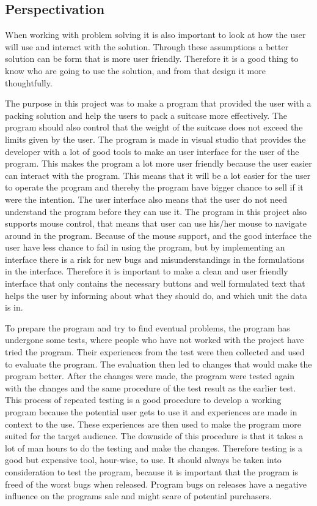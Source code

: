 \subsection{Perspectivation}
When working with problem solving it is also important to look at how the user will use and interact with the solution. Through these assumptions a better solution can be form that is more user friendly. Therefore it is a good thing to know who are going to use the solution, and from that design it more thoughtfully.

The purpose in this project was to make a program that provided the user with a packing solution and help the users to pack a suitcase more effectively. The program should also control that the weight of the suitcase does not exceed the limits given by the user. The program is made in visual studio that provides the developer with a lot of good tools to make an user interface for the user of the program.
This makes the program a lot more user friendly because the user easier can interact with the program. This means that it will be a lot easier for the user to operate the program and thereby the program have bigger chance to sell if it were the intention.
The user interface also means that the user do not need understand the program before they can use it.
The program in this project also supports mouse control, that means that user can use his/her mouse to navigate around in the program. Because of the mouse support, and the good interface the user have less chance to fail in using the program, but by implementing an interface there is a risk for new bugs and misunderstandings in the formulations in the interface.
Therefore it is important to make a clean and user friendly interface that only contains the necessary buttons and well formulated text that helps the user by informing about what they should do, and which unit the data is in.

To prepare the program and try to find eventual problems, the program has undergone some tests, where people who have not worked with the project have tried the program. Their experiences from the test were then collected and used to evaluate the program. The evaluation then led to changes that would make the program better. After the changes were made, the program were tested again with the changes and the same procedure of the test result as the earlier test.
This process of repeated testing is a good procedure to develop a working program because the potential user gets to use it and experiences are made in context to the use. These experiences are then used to make the program more suited for the target audience. The downside of this procedure is that it takes a lot of man hours to do the testing and make the changes. Therefore testing is a good but expensive tool, hour-wise, to use.
It should always be taken into consideration to test the program, because it is important that the program is freed of the worst bugs when released. Program bugs on releases have a negative influence on the programs sale and might scare of potential purchasers.

